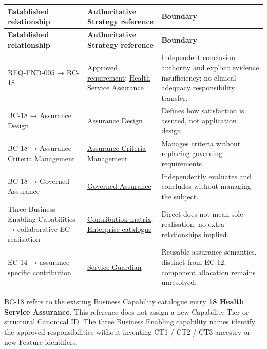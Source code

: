 \label{rad:assurance-strategy:43}
\begingroup\small\setlength{\TableWidth}{\dimexpr\linewidth-6\tabcolsep-4\arrayrulewidth\relax}
\begin{longtable}{|>{\raggedright\arraybackslash}p{0.24\TableWidth}|>{\raggedright\arraybackslash}p{0.33\TableWidth}|>{\raggedright\arraybackslash}p{0.43\TableWidth}|}
\hline\rowcolor{TableHead}\textbf{Established relationship} & \textbf{Authoritative Strategy reference} & \textbf{Boundary}\\\hline\endfirsthead
\hline\rowcolor{TableHead}\textbf{Established relationship} & \textbf{Authoritative Strategy reference} & \textbf{Boundary}\\\hline\endhead
\hline\endfoot
REQ-FND-005 → BC-18 & \href{https://github.com/fhirfactory/harmonia/blob/98410db60155198a75f74c79d98060070209faa1/docs/markdown/01-motivation/requirements-constraints/foundational-requirements.md\#req-fnd-005-independent-assurance-of-governed-activity}{Approved requirement}; \hyperref[rad:business:1033]{Health Service Assurance} & Independent conclusion authority and explicit evidence insufficiency; no clinical-adequacy responsibility transfer.\\\hline
BC-18 → Assurance Design & \hyperref[rad:enabling:680]{Assurance Design} & Defines how satisfaction is assured, not application design.\\\hline
BC-18 → Assurance Criteria Management & \hyperref[rad:enabling:686]{Assurance Criteria Management} & Manages criteria without replacing governing requirements.\\\hline
BC-18 → Governed Assurance & \hyperref[rad:enabling:694]{Governed Assurance} & Independently evaluates and concludes without managing the subject.\\\hline
Three Business Enabling Capabilities → collaborative EC realisation & \hyperref[rad:assurance-strategy:54]{Contribution matrix}; \hyperref[rad:enterprise]{Enterprise catalogue} & Direct does not mean sole realisation; no extra relationships implied.\\\hline
EC-14 → assurance-specific contribution & \hyperref[rad:enterprise:224]{Service Guardian} & Reusable assurance semantics, distinct from EC-12; component allocation remains unresolved.\\\hline
\end{longtable}\endgroup
{}\label{rad:assurance-strategy:52}

BC-18 refers to the existing Business Capability catalogue entry \textbf{18 Health Service Assurance}. This reference does not assign a new Capability Tier or structural Canonical ID. The three Business Enabling capability names identify the approved responsibilities without inventing CT1 /\allowbreak{} CT2 /\allowbreak{} CT3 ancestry or new Feature identifiers.

